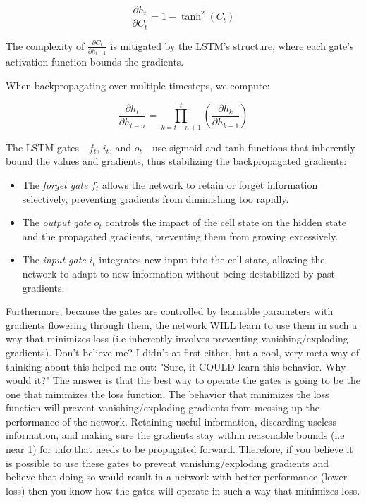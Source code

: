 \documentclass[12pt]{article}
\begin{document}
\begin{equation}
\frac{\partial h_t}{\partial C_t} = 1 - \tanh^2(C_t)
\end{equation}

The complexity of \( \frac{\partial C_t}{\partial h_{t-1}} \) is mitigated by the LSTM's structure, where each gate's activation function bounds the gradients.

When backpropagating over multiple timesteps, we compute:

\begin{equation}
\frac{\partial h_t}{\partial h_{t-n}} = \prod_{k=t-n+1}^{t} \left( \frac{\partial h_k}{\partial h_{k-1}} \right)
\end{equation}

The LSTM gates—\( f_t \), \( i_t \), and \( o_t \)—use sigmoid and tanh functions that inherently bound the values and gradients, thus stabilizing the backpropagated gradients:

\begin{itemize}
\item The \textit{forget gate} \( f_t \) allows the network to retain or forget information selectively, preventing gradients from diminishing too rapidly.
\item The \textit{output gate} \( o_t \) controls the impact of the cell state on the hidden state and the propagated gradients, preventing them from growing excessively.
\item The \textit{input gate} \( i_t \) integrates new input into the cell state, allowing the network to adapt to new information without being destabilized by past gradients.
\end{itemize}

Furthermore, because the gates are controlled by learnable parameters with gradients flowering through them, the network WILL learn to use them in such a way that minimizes loss (i.e inherently involves preventing vanishing/exploding gradients). Don't believe me? I didn't at first either, but a cool, very meta way of thinking about this helped me out: "Sure, it COULD learn this behavior. Why would it?" The answer is that the best way to operate the gates is going to be the one that minimizes the loss function. The behavior that minimizes the loss function will prevent vanishing/exploding gradients from messing up the performance of the network. Retaining useful information, discarding useless information, and making sure the gradients stay within reasonable bounds (i.e near 1) for info that needs to be propagated forward. Therefore, if you believe it is possible to use these gates to prevent vanishing/exploding gradients and believe that doing so would result in a network with better performance (lower loss) then you know how the gates will operate in such a way that minimizes loss.\\
\end{document}
